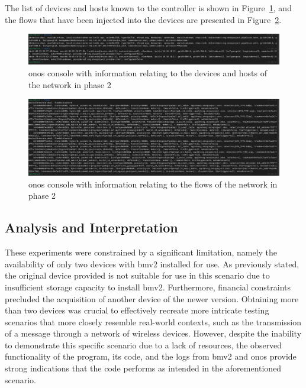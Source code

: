 The list of devices and hosts known to the controller is shown in Figure~\ref{fig:exp2_phase2_onos}, and the flows that have been injected into the devices are presented in Figure~\ref{fig:exp2_phase2_onos_flows}.

\begin{figure}
	\centering
	\includegraphics[width=\textwidth]{Chapters/Figures/tests/bmv2_phase_2/onos_topology.PNG}
	\caption{\gls{onos} console with information relating to the devices and hosts of the network in phase 2}
	\label{fig:exp2_phase2_onos}
\end{figure}

\begin{figure}
	\centering
	\includegraphics[width=\textwidth]{Chapters/Figures/tests/bmv2_phase_2/onos_flows.PNG}
	\caption{\gls{onos} console with information relating to the flows of the network in phase 2}
	\label{fig:exp2_phase2_onos_flows}
\end{figure}



\subsection{Analysis and Interpretation}

These experiments were constrained by a significant limitation, namely the availability of only two devices with \gls{bmv2} installed for use. As previously stated, the original device provided is not suitable for use in this scenario due to insufficient storage capacity to install \gls{bmv2}. Furthermore, financial constraints precluded the acquisition of another device of the newer version.
Obtaining more than two devices was crucial to effectively recreate more intricate testing scenarios that more closely resemble real-world contexts, such as the transmission of a message through a network of wireless devices. However, despite the inability to demonstrate this specific scenario due to a lack of resources, the observed functionality of the program, its code, and the logs from \gls{bmv2} and \gls{onos} provide strong indications that the code performs as intended in the aforementioned scenario.

